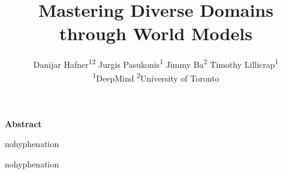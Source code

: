 \documentclass[12pt]{article}
\title{\vspace*{-2.5ex}\bfseries Mastering Diverse Domains through World Models}
\date{}
\author{
Danijar Hafner\rlap{,}\textsuperscript{12}\enskip
Jurgis Pasukonis\rlap{,}\textsuperscript{1}\enskip
Jimmy Ba\rlap{,}\textsuperscript{2}\enskip
Timothy Lillicrap\textsuperscript{1}
\\[1.5ex]\small{
\textsuperscript{1}DeepMind\quad
\textsuperscript{2}University of Toronto
}}
\begin{document}
\pagestyle{fancy}

\maketitle
\thispagestyle{first}

\begin{center}\bfseries
\vspace{-.5ex}
Abstract
\vspace{-.2ex}
\end{center}
\begin{adjustwidth}{1cm}{1cm}
\begin{hyphenrules}{nohyphenation}
\ignorespaces

\end{hyphenrules}
\end{adjustwidth}

\vfill

\vfill
\clearpage







\clearpage
\begin{hyphenrules}{nohyphenation}
\setlength{\bibsep}{.5ex plus .8ex}

\end{hyphenrules}
\clearpage
\appendix
{}

\end{document}
